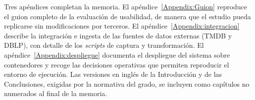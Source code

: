 Tres apéndices completan la memoria. El apéndice~\ref{Appendix:Guion} reproduce el guion completo
de la evaluación de usabilidad, de manera que el estudio pueda replicarse sin modificaciones por
terceros. El apéndice~\ref{Appendix:integracion} describe la integración e ingesta de las fuentes
de datos externas (TMDB y DBLP), con detalle de los \textit{scripts} de captura y transformación.
El apéndice~\ref{Appendix:despliegue} documenta el despliegue del sistema sobre contenedores y
recoge las decisiones operativas que permiten reproducir el entorno de ejecución. Las versiones
en inglés de la Introducción y de las Conclusiones, exigidas por la normativa del grado, se
incluyen como capítulos no numerados al final de la memoria.
